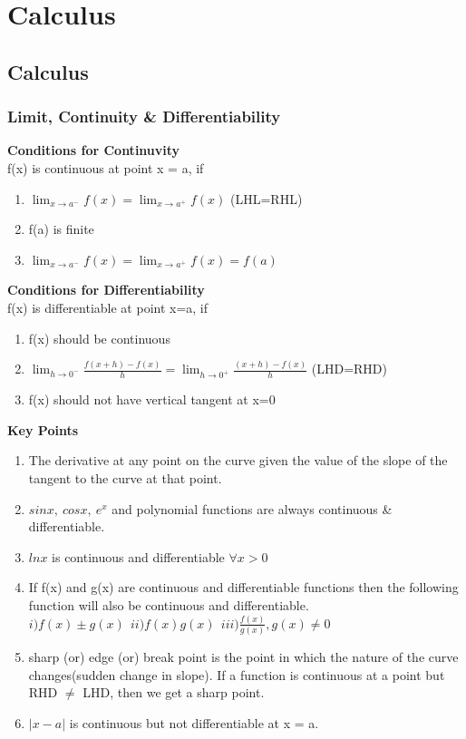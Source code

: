 \chapter*{Calculus}
\section{Calculus}

\subsection{Limit, Continuity \& Differentiability}
\textbf{Conditions for Continuvity} \vspace{0.2cm} \\
f(x) is continuous at point x = a, if
\begin{enumerate}
    \item \(\lim_{x\to a^-} f(x)=\lim_{x\to a^+} f(x) \) (LHL=RHL)
    \item f(a) is finite
    \item \(\lim_{x\to a^-} f(x)=\lim_{x\to a^+} f(x) =f(a)\)
\end{enumerate}
\textbf{Conditions for Differentiability} \vspace{0.2cm} \\
f(x) is differentiable at point x=a, if
\begin{enumerate}
    \item f(x) should be continuous
    \item \(\lim_{h\to0^-}\frac{f(x+h)-f(x)}{h}=\lim_{h\to0^+}\frac{(x+h)-f(x)}{h}\) (LHD=RHD)
    \item f(x) should not have vertical tangent at x=0
\end{enumerate}
\textbf{Key Points}
\begin{enumerate}
    \item The derivative at any point on the curve given the value of the slope of the tangent to the curve at that point.
    \item \(sinx,\ cosx,\ e^x\) and polynomial functions are always continuous \& differentiable.
    \item \(lnx\) is continuous and differentiable \(\forall x>0\)
    \item If f(x) and g(x) are continuous and differentiable functions then the following function will also be continuous and differentiable.
        \(i) f(x) \pm g(x) \ \ ii) f(x)g(x) \ \ iii) \frac{f(x)}{g(x)}, g(x) \neq 0\)
    \item sharp (or) edge (or) break point is the point in which the nature of the curve changes(sudden change in slope). If a function is continuous at a point but RHD \( \neq \) LHD, then we get a sharp point.
    \item \(|x-a|\) is continuous but not differentiable at x = a.
\end{enumerate}

